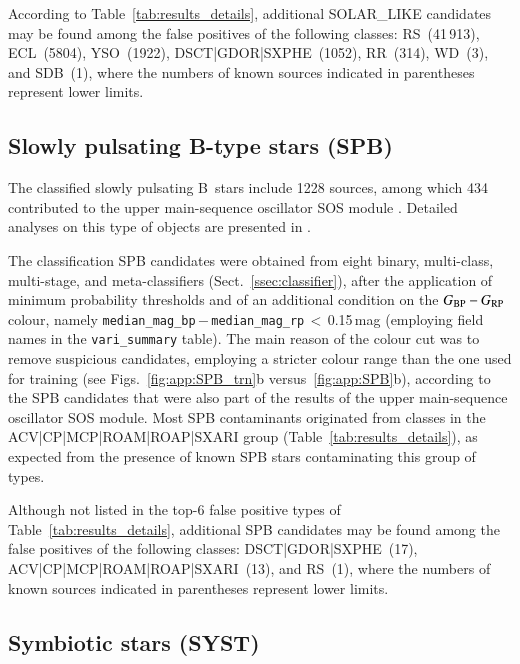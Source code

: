 \documentclass[longauth]{aa}
\def\gdr3{\textit{Gaia}~DR3\xspace}
\def\bprp{\mbox{$G_{\rm BP}-G_{\rm RP}$}\xspace}
\begin{document}
According to Table~\ref{tab:results_details}, additional SOLAR\_LIKE candidates may be found among the false positives of the following classes: RS~(41\,913), ECL~(5804),  YSO~(1922), DSCT|GDOR|SXPHE~(1052), RR~(314), WD~(3), and SDB~(1), where the numbers of known sources indicated in parentheses represent lower limits.



\subsection{Slowly pulsating B-type stars (SPB)\label{ssec:spb}}

The classified slowly pulsating B~stars include 1228 sources, among which 434 contributed to the upper main-sequence oscillator SOS module \citep[see sect.~10.14 of the \gdr3 documentation;][]{2022gdr3.reptE..10R}. Detailed analyses on this type of objects are presented in \citet{DR3-DPACP-79}.

The classification SPB candidates were obtained from eight binary, multi-class, multi-stage, and meta-classifiers (Sect.~\ref{ssec:classifier}), after the application of minimum probability thresholds and of an additional condition on the \bprp colour, namely \texttt{median\_mag\_bp}\,$-$\,\texttt{median\_mag\_rp}\,$<$\,0.15\,mag (employing field names in the \texttt{vari\_summary} table). The main reason of the colour cut was to remove suspicious candidates, employing a stricter colour range than the one used for training (see Figs.~\ref{fig:app:SPB_trn}b versus~\ref{fig:app:SPB}b), according to the SPB candidates that were also part of the results of the upper main-sequence oscillator SOS module. 
Most SPB contaminants originated from classes in the ACV|CP|MCP|ROAM|ROAP|SXARI group (Table~\ref{tab:results_details}), as expected from the presence of known SPB stars contaminating this group of types.

Although not listed in the top-6 false positive types of Table~\ref{tab:results_details}, additional SPB candidates may be found among the false positives of the following classes: DSCT|GDOR|SXPHE~(17), ACV|CP|MCP|ROAM|ROAP|SXARI~(13), and RS~(1), where the numbers of known sources indicated in parentheses represent lower limits.


\subsection{Symbiotic stars (SYST)\label{ssec:syst}}
\end{document}
